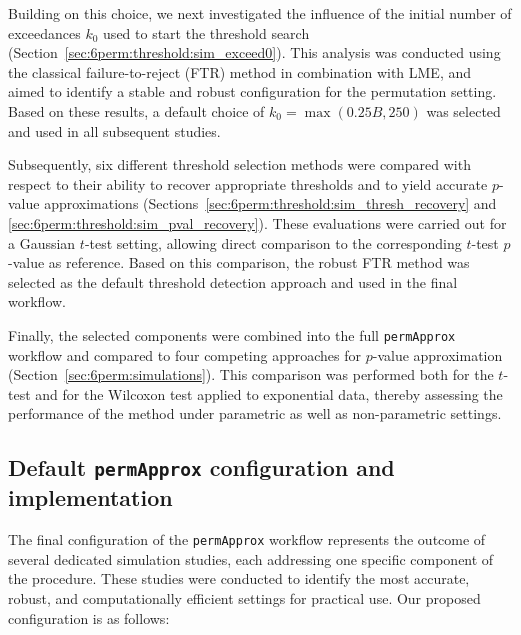 Building on this choice, we next investigated the influence of the initial number of exceedances $k_0$ used to start the threshold search (Section~\ref{sec:6perm:threshold:sim_exceed0}). This analysis was conducted using the classical failure-to-reject (FTR) method in combination with LME, and aimed to identify a stable and robust configuration for the permutation setting. Based on these results, a default choice of $k_0 = \max(0.25B, 250)$ was selected and used in all subsequent studies.

Subsequently, six different threshold selection methods were compared with respect to their ability to recover appropriate thresholds and to yield accurate $p$-value approximations (Sections~\ref{sec:6perm:threshold:sim_thresh_recovery} and \ref{sec:6perm:threshold:sim_pval_recovery}). These evaluations were carried out for a Gaussian $t$-test setting, allowing direct comparison to the corresponding $t$-test $p$-value as reference. Based on this comparison, the robust FTR method was selected as the default threshold detection approach and used in the final workflow.

Finally, the selected components were combined into the full \texttt{permApprox} workflow and compared to four competing approaches for $p$-value approximation (Section~\ref{sec:6perm:simulations}). This comparison was performed both for the $t$-test and for the Wilcoxon test applied to exponential data, thereby assessing the performance of the method under parametric as well as non-parametric settings.



\subsection{Default \texttt{permApprox} configuration and implementation}
\label{sec:6perm:workflow:default_config}

The final configuration of the \texttt{permApprox} workflow represents the outcome of several dedicated simulation studies, each addressing one specific component of the procedure. These studies were conducted to identify the most accurate, robust, and computationally efficient settings for practical use. Our proposed configuration is as follows:

